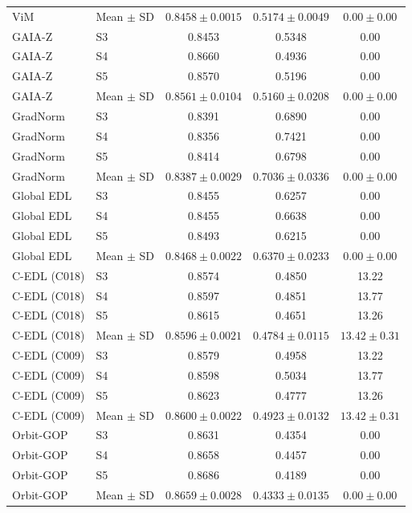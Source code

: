 \begin{longtable}{@{}llccc@{}}
ViM & Mean $\pm$ SD & $0.8458 \pm 0.0015$ & $0.5174 \pm 0.0049$ & $0.00 \pm 0.00$ \\
GAIA-Z & S3 & 0.8453 & 0.5348 & 0.00 \\
GAIA-Z & S4 & 0.8660 & 0.4936 & 0.00 \\
GAIA-Z & S5 & 0.8570 & 0.5196 & 0.00 \\
GAIA-Z & Mean $\pm$ SD & $0.8561 \pm 0.0104$ & $0.5160 \pm 0.0208$ & $0.00 \pm 0.00$ \\
GradNorm & S3 & 0.8391 & 0.6890 & 0.00 \\
GradNorm & S4 & 0.8356 & 0.7421 & 0.00 \\
GradNorm & S5 & 0.8414 & 0.6798 & 0.00 \\
GradNorm & Mean $\pm$ SD & $0.8387 \pm 0.0029$ & $0.7036 \pm 0.0336$ & $0.00 \pm 0.00$ \\
Global EDL & S3 & 0.8455 & 0.6257 & 0.00 \\
Global EDL & S4 & 0.8455 & 0.6638 & 0.00 \\
Global EDL & S5 & 0.8493 & 0.6215 & 0.00 \\
Global EDL & Mean $\pm$ SD & $0.8468 \pm 0.0022$ & $0.6370 \pm 0.0233$ & $0.00 \pm 0.00$ \\
C-EDL (C018) & S3 & 0.8574 & 0.4850 & 13.22 \\
C-EDL (C018) & S4 & 0.8597 & 0.4851 & 13.77 \\
C-EDL (C018) & S5 & 0.8615 & 0.4651 & 13.26 \\
C-EDL (C018) & Mean $\pm$ SD & $0.8596 \pm 0.0021$ & $0.4784 \pm 0.0115$ & $13.42 \pm 0.31$ \\
C-EDL (C009) & S3 & 0.8579 & 0.4958 & 13.22 \\
C-EDL (C009) & S4 & 0.8598 & 0.5034 & 13.77 \\
C-EDL (C009) & S5 & 0.8623 & 0.4777 & 13.26 \\
C-EDL (C009) & Mean $\pm$ SD & $0.8600 \pm 0.0022$ & $0.4923 \pm 0.0132$ & $13.42 \pm 0.31$ \\
Orbit-GOP & S3 & 0.8631 & 0.4354 & 0.00 \\
Orbit-GOP & S4 & 0.8658 & 0.4457 & 0.00 \\
Orbit-GOP & S5 & 0.8686 & 0.4189 & 0.00 \\
Orbit-GOP & Mean $\pm$ SD & $0.8659 \pm 0.0028$ & $0.4333 \pm 0.0135$ & $0.00 \pm 0.00$ \\
\end{longtable}
\endgroup

\clearpage
